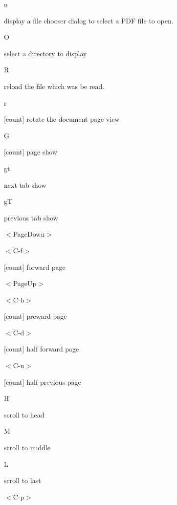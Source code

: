 \documentclass[a4paper,12pt]{article}
\begin{document}
\begin{description}

\item o

display a file chooser dialog to select a PDF file to open.

\item O

select a directory to display

\item R

reload the file which was be read.

\item r

[count] rotate the document page view

\item G

[count] page show

\item gt

next tab show

\item gT

previous tab show

\item $<$PageDown$>$

\item $<$C-f$>$

[count] forward page 

\item $<$PageUp$>$

\item $<$C-b$>$

[count] preward page 

\item $<$C-d$>$

[count] half forward page 

\item $<$C-u$>$

[count] half previous page 

\item H

scroll to head

\item M

scroll to middle

\item L

scroll to last

\item $<$C-p$>$


\end{description}
\end{document}
